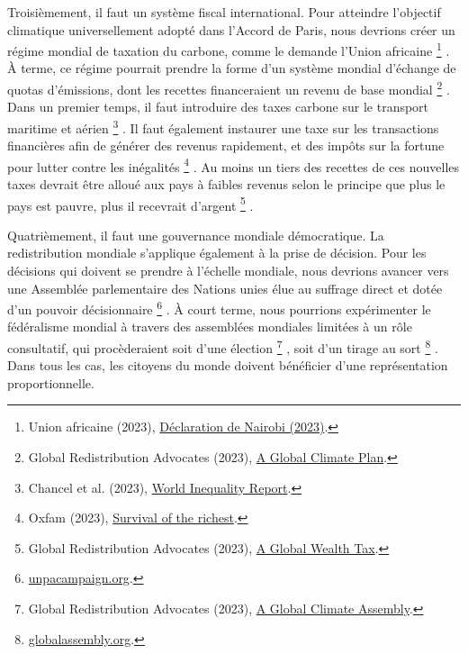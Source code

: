 \documentclass[a5paper,french,openany]{memoir}
\begin{document}
Troisièmement, il faut un système fiscal international. Pour atteindre l'objectif climatique universellement adopté dans l'Accord de Paris, nous devrions créer un régime mondial de taxation du carbone, comme le demande l'Union africaine
\footnote{Union africaine (2023), \href{https://media.africaclimatesummit.org/NAIROBI+Declaration+FURTHER+edited+060923+EN+920AM.pdf}{Déclaration de Nairobi (2023)}.}%
.  À terme, ce régime pourrait prendre la forme d'un système mondial d'échange de quotas d'émissions, dont les recettes financeraient un revenu de base mondial
\footnote{Global Redistribution Advocates (2023), \href{https://github.com/bixiou/global\_tax\_attitudes/raw/main/paper/policy\_brief\_GCS.pdf}{A Global Climate Plan}.}%
. Dans un premier temps, il faut introduire des taxes carbone sur le transport maritime et aérien
\footnote{Chancel et al. (2023), \href{https://wid.world/wp-content/uploads/2023/01/CBV2023-ClimateInequalityReport-3.pdf}{World Inequality Report}.}%
. Il faut également instaurer une taxe sur les transactions financières afin de générer des revenus rapidement, et des impôts sur la fortune pour lutter contre les inégalités
\footnote{Oxfam (2023), \href{https://oxfamilibrary.openrepository.com/bitstream/handle/10546/621477/mn-survival-of-the-richest-methodology-160123-en.pdf}{Survival of the richest}.}%
. Au moins un tiers des recettes de ces nouvelles taxes devrait être alloué aux pays à faibles revenus selon le principe que plus le pays est pauvre, plus il recevrait d'argent
\footnote{Global Redistribution Advocates (2023), \href{https://github.com/bixiou/global\_tax\_attitudes/raw/main/paper/policy\_brief\_tax.pdf}{A Global Wealth Tax}.}%
.

Quatrièmement, il faut une gouvernance mondiale démocratique. La redistribution mondiale s'applique également à la prise de décision. Pour les décisions qui doivent se prendre à l'échelle mondiale, nous devrions avancer vers une Assemblée parlementaire des Nations unies élue au suffrage direct et dotée d'un pouvoir décisionnaire
\footnote{\href{https://www.unpacampaign.org/}{unpacampaign.org}.}%
. À court terme, nous pourrions expérimenter le fédéralisme mondial à travers des assemblées mondiales limitées à un rôle consultatif, qui procèderaient soit d'une élection
\footnote{Global Redistribution Advocates (2023), \href{https://github.com/bixiou/global\_tax\_attitudes/raw/main/paper/policy\_brief\_assembly.pdf}{A Global Climate Assembly}.}%
, soit d'un tirage au sort
\footnote{\href{https://globalassembly.org/}{globalassembly.org}.}%
. Dans tous les cas, les citoyens du monde doivent bénéficier d'une représentation proportionnelle.
\end{document}
